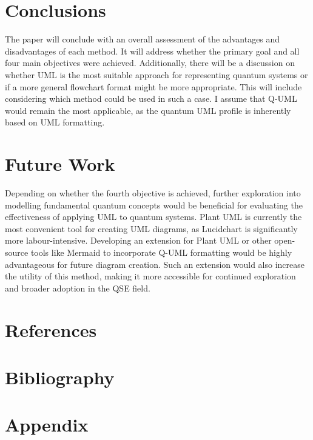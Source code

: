 \documentclass{article}
\begin{document}
\section{Conclusions}

The paper will conclude with an overall assessment of the advantages and disadvantages of each method. It will address whether the primary goal and all four main objectives were achieved. Additionally, there will be a discussion on whether UML is the most suitable approach for representing quantum systems or if a more general flowchart format might be more appropriate. This will include considering which method could be used in such a case. I assume that Q-UML would remain the most applicable, as the quantum UML profile is inherently based on UML formatting.

\section{Future Work}

Depending on whether the fourth objective is achieved, further exploration into modelling fundamental quantum concepts would be beneficial for evaluating the effectiveness of applying UML to quantum systems.
Plant UML is currently the most convenient tool for creating UML diagrams, as Lucidchart is significantly more labour-intensive. Developing an extension for Plant UML or other open-source tools like Mermaid to incorporate Q-UML formatting would be highly advantageous for future diagram creation. Such an extension would also increase the utility of this method, making it more accessible for continued exploration and broader adoption in the QSE field.

\section*{References}

\section{Bibliography}
\printbibliography

\section{Appendix}
\end{document}

